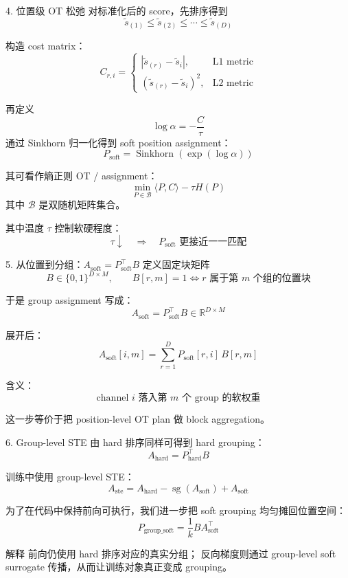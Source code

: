 \documentclass[aspectratio=169,professionalfonts]{ctexbeamer}
\newcommand{\R}{\mathbb{R}}
\newcommand{\Stop}{\operatorname{sg}}
\newcommand{\Sinkhorn}{\operatorname{Sinkhorn}}
\begin{document}
\begin{frame}{4. 位置级 OT 松弛}
  对标准化后的 score，先排序得到
  \[
    \tilde{s}_{(1)} \le \tilde{s}_{(2)} \le \cdots \le \tilde{s}_{(D)}
  \]

  构造 cost matrix：
  \[
    C_{r,i} =
    \begin{cases}
      |\tilde{s}_{(r)}-\tilde{s}_i|, & \text{L1 metric}\\[0.3em]
      (\tilde{s}_{(r)}-\tilde{s}_i)^2, & \text{L2 metric}
    \end{cases}
  \]

  再定义
  \[
    \log \alpha = -\frac{C}{\tau}
  \]
  通过 Sinkhorn 归一化得到 soft position assignment：
  \[
    P_{\mathrm{soft}} = \Sinkhorn(\exp(\log \alpha))
  \]

  其可看作熵正则 OT / assignment：
  \[
    \min_{P \in \mathcal{B}}
    \langle P, C \rangle - \tau H(P)
  \]
  其中 $\mathcal{B}$ 是双随机矩阵集合。

  \vspace{0.3em}
  其中温度 $\tau$ 控制软硬程度：
  \[
    \tau \downarrow \quad \Longrightarrow \quad P_{\mathrm{soft}} \text{ 更接近一一匹配}
  \]
\end{frame}

\begin{frame}{5. 从位置到分组：\texorpdfstring{$A_{\mathrm{soft}} = P_{\mathrm{soft}}^\top B$}{Asoft = Psoft^T B}}
  定义固定块矩阵
  \[
    B \in \{0,1\}^{D \times M}, \qquad
    B[r,m]=1 \Leftrightarrow r \text{ 属于第 } m \text{ 个组的位置块}
  \]

  于是 group assignment 写成：
  \[
    A_{\mathrm{soft}} = P_{\mathrm{soft}}^\top B \in \R^{D \times M}
  \]

  展开后：
  \[
    A_{\mathrm{soft}}[i,m]
    =
    \sum_{r=1}^{D} P_{\mathrm{soft}}[r,i]\, B[r,m]
  \]

  含义：
  \[
    \text{channel } i \text{ 落入第 } m \text{ 个 group 的软权重}
  \]

  这一步等价于把 position-level OT plan 做 block aggregation。
\end{frame}

\begin{frame}{6. Group-level STE}
  由 hard 排序同样可得到 hard grouping：
  \[
    A_{\mathrm{hard}} = P_{\mathrm{hard}}^\top B
  \]

  训练中使用 group-level STE：
  \[
    A_{\mathrm{ste}}
    = A_{\mathrm{hard}} - \Stop(A_{\mathrm{soft}}) + A_{\mathrm{soft}}
  \]

  为了在代码中保持前向可执行，我们进一步把 soft grouping 均匀摊回位置空间：
  \[
    P_{\mathrm{group\_soft}} = \frac{1}{k} B A_{\mathrm{soft}}^\top
  \]

  \begin{block}{解释}
    前向仍使用 hard 排序对应的真实分组；
    反向梯度则通过 group-level soft surrogate 传播，从而让训练对象真正变成 grouping。
  \end{block}
\end{frame}
\end{document}
